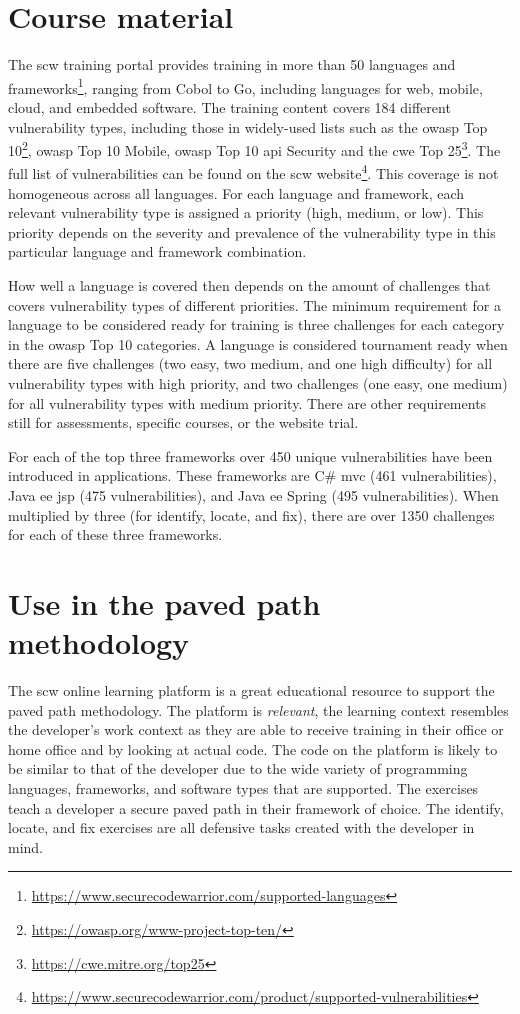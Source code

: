 \section{Course material}
The \gls{scw} training portal provides training in more than 50 languages and frameworks\footnote{\url{https://www.securecodewarrior.com/supported-languages}}, ranging from Cobol to Go, including languages for web, mobile, cloud, and embedded software.
The training content covers 184 different vulnerability types, including those in widely-used lists such as the \gls{owasp} Top 10\footnote{\url{https://owasp.org/www-project-top-ten/}}, \gls{owasp} Top 10 Mobile, \gls{owasp} Top 10 \gls{api} Security and the \gls{cwe} Top 25\footnote{\url{https://cwe.mitre.org/top25}}.
The full list of vulnerabilities can be found on the \gls{scw} website\footnote{\url{https://www.securecodewarrior.com/product/supported-vulnerabilities}}.
This coverage is not homogeneous across all languages.
For each language and framework, each relevant vulnerability type is assigned a priority (high, medium, or low).
This priority depends on the severity and prevalence of the vulnerability type in this particular language and framework combination.

How well a language is covered then depends on the amount of challenges that covers vulnerability types of different priorities. 
The minimum requirement for a language to be considered ready for training is three challenges for each category in the \gls{owasp} Top 10 categories.
A language is considered tournament ready when there are five challenges (two easy, two medium, and one high difficulty) for all vulnerability types with high priority, and two challenges (one easy, one medium) for all vulnerability types with medium priority.
There are other requirements still for assessments, specific courses, or the website trial.

For each of the top three frameworks over 450 unique vulnerabilities have been introduced in applications. These frameworks are C\# \gls{mvc} (461 vulnerabilities), Java \gls{ee} \gls{jsp} (475 vulnerabilities), and Java \gls{ee} Spring (495 vulnerabilities). When multiplied by three (for identify, locate, and fix), there are over 1350 challenges for each of these three frameworks.

\section{Use in the paved path methodology}
The \gls{scw} online learning platform is a great educational resource to support the paved path methodology.
The platform is \textit{relevant}, the learning context resembles the developer's work context as they are able to receive training in their office or home office and by looking at actual code. 
The code on the platform is likely to be similar to that of the developer due to the wide variety of programming languages, frameworks, and software types that are supported. 
The exercises teach a developer a secure paved path in their framework of choice. The identify, locate, and fix exercises are all defensive tasks created with the developer in mind.

